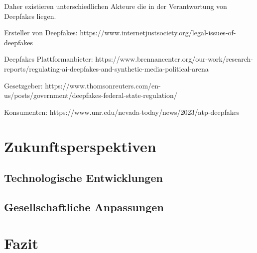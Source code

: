 \documentclass[a4paper,12pt]{article}
\begin{document}
Daher existieren unterschiedlichen Akteure die in der Verantwortung von Deepfakes liegen.

Ersteller von Deepfakes:
https://www.internetjustsociety.org/legal-issues-of-deepfakes

Deepfakes Plattformanbieter:
https://www.brennancenter.org/our-work/research-reports/regulating-ai-deepfakes-and-synthetic-media-political-arena

Gesetzgeber:
https://www.thomsonreuters.com/en-us/posts/government/deepfakes-federal-state-regulation/

Konsumenten:
https://www.unr.edu/nevada-today/news/2023/atp-deepfakes
\newpage
\section{Zukunftsperspektiven}
\subsection{Technologische Entwicklungen}
\subsection{Gesellschaftliche Anpassungen}
\newpage

\section{Fazit}



\newpage
{}
\end{document}
